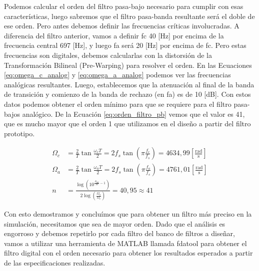 Podemos calcular el orden del filtro pasa-bajo necesario para cumplir con esas características, luego sabremos que el filtro pasa-banda resultante será el doble de ese orden. Pero antes debemos definir las frecuencias críticas involucradas. A diferencia del filtro anterior, vamos a definir \gls{fc} 40 [Hz] por encima de la frecuencia central 697 [Hz], y luego \gls{fa} será 20 [Hz] por encima de \gls{fc}. Pero estas frecuencias son digitales, debemos calcularlas con la distorsión de la Transformación Bilineal (Pre-Warping) para resolver el orden. En las Ecuaciones \ref{eq:omega_c_analog} y \ref{eq:omega_a_analog} podemos ver las frecuencias analógicas resultantes. Luego, establecemos que la atenuación al final de la banda de transición y comienzo de la banda de rechazo (en \gls{fa}) es de 10 [dB]. Con estos datos podemos obtener el orden mínimo para que se requiere para el filtro pasa-bajos analógico. De la Ecuación \ref{eq:orden_filtro_pb} vemos que el valor es 41, que es mucho mayor que el orden 1 que utilizamos en el diseño a partir del filtro prototipo.

\begin{align}
  \Omega_c & = \frac{2}{T} \tan \frac{\omega_c T}{2} = 2 f_s \tan\left(\pi \frac{f_c}{f_s}\right) = 4634,99 \mathrm{\left[\frac{rad}{s}\right]} \label{eq:omega_c_analog} \\
  \Omega_a & = \frac{2}{T} \tan \frac{\omega_a T}{2} = 2 f_s \tan\left(\pi \frac{f_a}{f_s}\right) = 4761,01 \mathrm{\left[\frac{rad}{s}\right]} \label{eq:omega_a_analog} \\
  n        & = \frac{\log\left(10^{\frac{A_{dB}}{10}-1}\right)}{2\log\left(\frac{\Omega_a}{\Omega_c}\right)} = 40,95 \approx 41 \label{eq:orden_filtro_pb}
\end{align}

Con esto demostramos y concluímos que para obtener un filtro más preciso en la simulación, necesitamos que sea de mayor orden. Dado que el análisis es engorroso y debemos repetirlo por cada filtro del banco de filtros a diseñar, vamos a utilizar una herramienta de MATLAB llamada fdatool para obtener el filtro digital con el orden necesario para obtener los resultados esperados a partir de las especificaciones realizadas.
